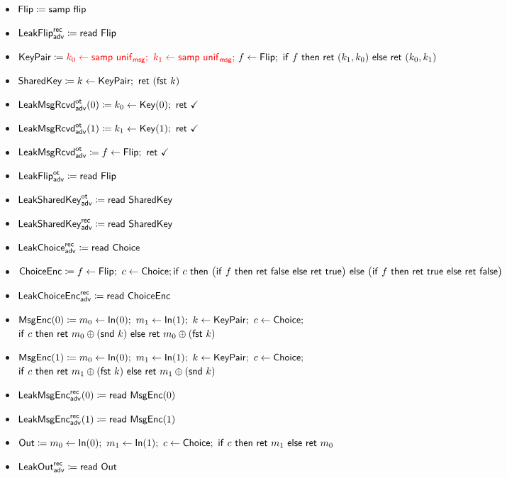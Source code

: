 \begin{itemize}
\item $\mathsf{Flip} \coloneqq \mathsf{samp} \ \mathsf{flip}$
\item {\color{blue} $\mathsf{LeakFlip}^{\mathsf{rec}}_{\mathsf{adv}} \coloneqq \mathsf{read} \ \mathsf{Flip}$}
\item $\KeyPair \coloneqq {\color{red} k_0 \leftarrow \samp{\unif_\msg}; \ k_1 \leftarrow \samp{\unif_\msg};} \ f \leftarrow \Flip; \ \ifte{f}{\ret{(k_1,k_0)}}{\ret{(k_0,k_1)}}$
\item $\mathsf{SharedKey} \coloneqq k \leftarrow \mathsf{KeyPair}; \ \mathsf{ret} \ (\mathsf{fst} \ k)$
\item {\color{blue} $\LeakKeyRcvd^\ot_\adv(0) \coloneqq k_0 \leftarrow \Key(0); \ \ret{\checkmark}$}
\item {\color{blue} $\LeakKeyRcvd^\ot_\adv(1) \coloneqq k_1 \leftarrow \Key(1); \ \ret{\checkmark}$}
\item {\color{blue} $\mathsf{LeakMsgRcvd}^{\mathsf{ot}}_{\mathsf{adv}} \coloneqq f \leftarrow \mathsf{Flip}; \ \mathsf{ret} \ \checkmark$}
\item {\color{blue} $\mathsf{LeakFlip}^{\mathsf{ot}}_{\mathsf{adv}} \coloneqq \mathsf{read} \ \mathsf{Flip}$}
\item {\color{blue} $\mathsf{LeakSharedKey}^{\mathsf{ot}}_{\mathsf{adv}} \coloneqq \mathsf{read} \ \mathsf{SharedKey}$}
\item {\color{blue} $\mathsf{LeakSharedKey}^{\mathsf{rec}}_{\mathsf{adv}} \coloneqq \mathsf{read} \ \mathsf{SharedKey}$}
\item {\color{blue} $\mathsf{LeakChoice}^{\mathsf{rec}}_{\mathsf{adv}} \coloneqq \mathsf{read} \ \mathsf{Choice}$}
\item $\mathsf{ChoiceEnc} \coloneqq f \leftarrow \mathsf{Flip}; \ c \leftarrow \mathsf{Choice}; \\ \mathsf{if} \ c \ \mathsf{then} \ \big(\mathsf{if} \ f \ \mathsf{then} \ \mathsf{ret} \ \mathsf{false} \ \mathsf{else} \ \mathsf{ret} \ \mathsf{true}\big) \ \mathsf{else} \ \big(\mathsf{if} \ f \ \mathsf{then} \ \mathsf{ret} \ \mathsf{true} \ \mathsf{else} \ \mathsf{ret} \ \mathsf{false}\big)$
\item {\color{blue} $\mathsf{LeakChoiceEnc}^{\mathsf{rec}}_{\mathsf{adv}} \coloneqq \mathsf{read} \ \mathsf{ChoiceEnc}$}
\item $\mathsf{MsgEnc}(0) \coloneqq m_0 \leftarrow \mathsf{In}(0); \ m_1 \leftarrow \mathsf{In}(1); \ k \leftarrow \mathsf{KeyPair}; \ c \leftarrow \mathsf{Choice};$ \\ $\ifte{c}{\ret{m_0 \oplus (\snd \ k)}}{\ret{m_0 \oplus (\fst \ k)}}$
\item $\mathsf{MsgEnc}(1) \coloneqq m_0 \leftarrow \mathsf{In}(0); \ m_1 \leftarrow \mathsf{In}(1); \ k \leftarrow \mathsf{KeyPair}; \ c \leftarrow \mathsf{Choice};$ \\ $\ifte{c}{\ret{m_1 \oplus (\fst \ k)}}{\ret{m_1 \oplus (\snd \ k)}}$
\item {\color{blue} $\mathsf{LeakMsgEnc}^{\mathsf{rec}}_{\mathsf{adv}}(0) \coloneqq \mathsf{read} \ \mathsf{MsgEnc}(0)$}
\item {\color{blue} $\mathsf{LeakMsgEnc}^{\mathsf{rec}}_{\mathsf{adv}}(1) \coloneqq \mathsf{read} \ \mathsf{MsgEnc}(1)$}
\item $\Out \coloneqq m_0 \leftarrow \In(0); \ m_1 \leftarrow \In(1); \ c \leftarrow \Choice; \ \ifte{c}{\ret{m_1}}{\ret{m_0}}$
\item {\color{blue} $\mathsf{LeakOut}^{\mathsf{rec}}_{\mathsf{adv}} \coloneqq \mathsf{read} \ \mathsf{Out}$}
\end{itemize}

